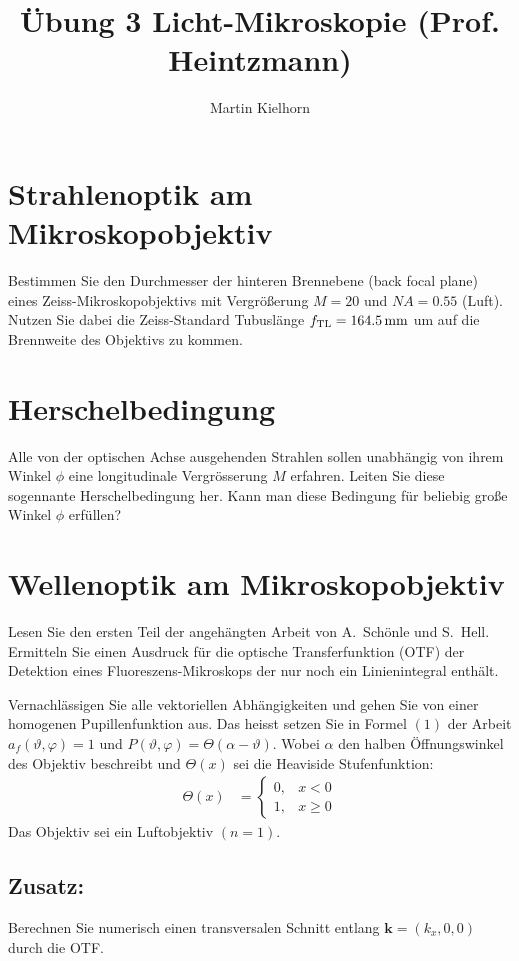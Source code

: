 \documentclass{article}
\begin{document}
\author{Martin Kielhorn}
\title{\"Ubung 3 Licht-Mikroskopie (Prof. Heintzmann)}
\maketitle

\section{Strahlenoptik am Mikroskopobjektiv}
Bestimmen Sie den Durchmesser der hinteren Brennebene (back focal
plane) eines Zeiss-Mikroskopobjektivs mit Vergr\"o\ss erung $M=20$ und
$NA=0.55$ (Luft). Nutzen Sie dabei die Zeiss-Standard Tubusl\"ange
$f_\textrm{TL}=\unit[164.5]{mm}$ um auf die Brennweite des Objektivs
zu kommen.

\section{Herschelbedingung}
Alle von der optischen Achse ausgehenden Strahlen sollen unabh\"angig
von ihrem Winkel $\phi$ eine longitudinale Vergr\"osserung $M$
erfahren. Leiten Sie diese sogennante Herschelbedingung her. Kann man
diese Bedingung f\"ur beliebig gro\ss e Winkel $\phi$ erf\"ullen?

\section{Wellenoptik am Mikroskopobjektiv}
Lesen Sie den ersten Teil der angeh\"angten Arbeit von A.~Sch\"onle
und S.~Hell. Ermitteln Sie einen Ausdruck f\"ur die optische
Transferfunktion (OTF) der Detektion eines Fluoreszens-Mikroskops der
nur noch ein Linienintegral enth\"alt.

Vernachl\"assigen Sie alle vektoriellen Abh\"angigkeiten und gehen Sie
von einer homogenen Pupillenfunktion aus. Das heisst setzen Sie in
Formel $(1)$ der Arbeit $a_f(\vartheta,\varphi)=1$ und
$P(\vartheta,\varphi)=\Theta(\alpha-\vartheta)$. Wobei $\alpha$ den halben
\"Offnungswinkel des Objektiv beschreibt und $\Theta(x)$ sei die
Heaviside Stufenfunktion:
\begin{align}
  \Theta(x)&=\begin{cases}
  0, & x<0 \\
  1, & x \ge 0
  \end{cases}
\end{align}
Das Objektiv sei ein Luftobjektiv $(n=1)$.

\subsection*{Zusatz:}
Berechnen Sie numerisch einen transversalen Schnitt entlang
$\mathbf{k}=(k_x,0,0)$ durch die OTF. %


\end{document}
